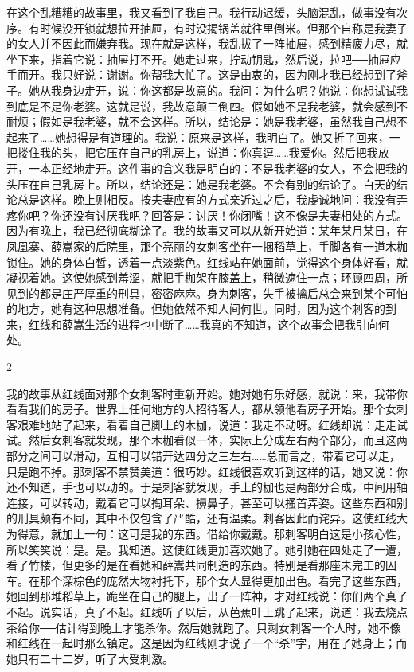 在这个乱糟糟的故事里，我又看到了我自己。我行动迟缓，头脑混乱，做事没有次序。有时候没开锁就想拉开抽屉，有时没揭锅盖就往里倒米。但那个自称是我妻子的女人并不因此而嫌弃我。现在就是这样，我乱拔了一阵抽屉，感到精疲力尽，就坐下来，指着它说：抽屉打不开。她走过来，拧动钥匙，然后说，拉吧──抽屉应手而开。我只好说：谢谢。你帮我大忙了。这是由衷的，因为刚才我已经想到了斧子。她从我身边走开，说：你这都是故意的。我问：为什么呢？她说：你想试试我到底是不是你老婆。这就是说，我故意颠三倒四。假如她不是我老婆，就会感到不耐烦；假如是我老婆，就不会这样。所以，结论是：她是我老婆，虽然我自己想不起来了……她想得是有道理的。我说：原来是这样，我明白了。她又折了回来，一把搂住我的头，把它压在自己的乳房上，说道：你真逗……我爱你。然后把我放开，一本正经地走开。这件事的含义我是明白的：不是我老婆的女人，不会把我的头压在自己乳房上。所以，结论还是：她是我老婆。不会有别的结论了。白天的结论总是这样。晚上则相反。按夫妻应有的方式亲近过之后，我虔诚地问：我没有弄疼你吧？你还没有讨厌我吧？回答是：讨厌！你闭嘴！这不像是夫妻相处的方式。因为有晚上，我已经彻底糊涂了。我的故事又可以从新开始道：某年某月某日，在凤凰寨、薛嵩家的后院里，那个亮丽的女刺客坐在一捆稻草上，手脚各有一道木枷锁住。她的身体白皙，透着一点淡紫色。红线站在她面前，觉得这个身体好看，就凝视着她。这使她感到羞涩，就把手枷架在膝盖上，稍微遮住一点；环顾四周，所见到的都是庄严厚重的刑具，密密麻麻。身为刺客，失手被擒后总会来到某个可怕的地方，她有这种思想准备。但她依然不知人间何世。同时，因为这个刺客的到来，红线和薛嵩生活的进程也中断了……我真的不知道，这个故事会把我引向何处。 

2 

我的故事从红线面对那个女刺客时重新开始。她对她有乐好感，就说：来，我带你看看我们的房子。世界上任何地方的人招待客人，都从领他看房子开始。那个女刺客艰难地站了起来，看着自己脚上的木枷，说道：我走不动呀。红线却说：走走试试。然后女刺客就发现，那个木枷看似一体，实际上分成左右两个部分，而且这两部分之间可以滑动，互相可以错开达四分之三左右……总而言之，带着它可以走，只是跑不掉。那刺客不禁赞美道：很巧妙。红线很喜欢听到这样的话，她又说：你还不知道，手也可以动的。于是刺客就发现，手上的枷也是两部分合成，中间用轴连接，可以转动，戴着它可以掏耳朵、擤鼻子，甚至可以搔首弄姿。这些东西和别的刑具颇有不同，其中不仅包含了严酷，还有温柔。刺客因此而诧异。这使红线大为得意，就加上一句：这可是我的东西。借给你戴戴。那刺客明白这是小孩心性，所以笑笑说：是。是。我知道。这使红线更加喜欢她了。她引她在四处走了一遭，看了竹楼，但更多的是在看她和薛嵩共同制造的东西。特别是看那座未完工的囚车。在那个深棕色的庞然大物衬托下，那个女人显得更加出色。看完了这些东西，她回到那堆稻草上，跪坐在自己的腿上，出了一阵神，才对红线说：你们两个真了不起。说实话，真了不起。红线听了以后，从芭蕉叶上跳了起来，说道：我去烧点茶给你──估计得到晚上才能杀你。然后她就跑了。只剩女刺客一个人时，她不像和红线在一起时那么镇定。这是因为红线刚才说了一个“杀”字，用在了她身上；而她只有二十二岁，听了大受刺激。 

